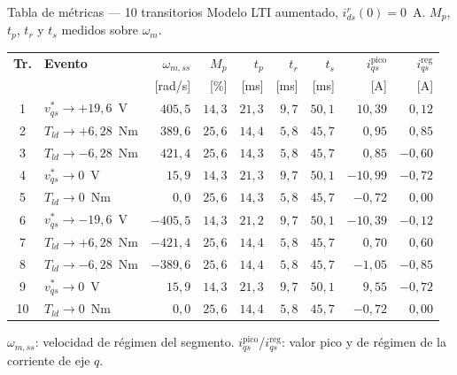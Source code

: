 \documentclass[aspectratio=169,t]{beamer}
\begin{document}
\begin{frame}{Tabla de métricas --- 10 transitorios}
{\small\color{uncGray}Modelo LTI aumentado, $i_{ds}^{r}(0)=0$~A. $M_p$, $t_p$, $t_r$ y $t_s$ medidos sobre $\omega_m$.}\par
\vspace{2mm}

\centering
\scriptsize
\renewcommand{\arraystretch}{1.1}
\begin{tabular}{|c|l|r|r|r|r|r|r|r|}
\hline
\textbf{Tr.} & \textbf{Evento} & $\omega_{m,ss}$ & $M_p$ & $t_p$ & $t_r$ & $t_s$ & $i_{qs}^{\text{pico}}$ & $i_{qs}^{\text{reg}}$ \\
 & & [rad/s] & [\%] & [ms] & [ms] & [ms] & [A] & [A] \\
\hline
1 & $v_{qs}^{*}\to+19{,}6$~V & $405{,}5$ & $14{,}3$ & $21{,}3$ & $9{,}7$ & $50{,}1$ & $10{,}39$ & $0{,}12$ \\
2 & $T_{ld}\to+6{,}28$~Nm & $389{,}6$ & $25{,}6$ & $14{,}4$ & $5{,}8$ & $45{,}7$ & $0{,}95$ & $0{,}85$ \\
3 & $T_{ld}\to-6{,}28$~Nm & $421{,}4$ & $25{,}6$ & $14{,}3$ & $5{,}8$ & $45{,}7$ & $0{,}85$ & $-0{,}60$ \\
4 & $v_{qs}^{*}\to 0$~V & $15{,}9$ & $14{,}3$ & $21{,}3$ & $9{,}7$ & $50{,}1$ & $-10{,}99$ & $-0{,}72$ \\
5 & $T_{ld}\to 0$~Nm & $0{,}0$ & $25{,}6$ & $14{,}3$ & $5{,}8$ & $45{,}7$ & $-0{,}72$ & $0{,}00$ \\
6 & $v_{qs}^{*}\to-19{,}6$~V & $-405{,}5$ & $14{,}3$ & $21{,}2$ & $9{,}7$ & $50{,}1$ & $-10{,}39$ & $-0{,}12$ \\
7 & $T_{ld}\to+6{,}28$~Nm & $-421{,}4$ & $25{,}6$ & $14{,}4$ & $5{,}8$ & $45{,}7$ & $0{,}70$ & $0{,}60$ \\
8 & $T_{ld}\to-6{,}28$~Nm & $-389{,}6$ & $25{,}6$ & $14{,}4$ & $5{,}8$ & $45{,}7$ & $-1{,}05$ & $-0{,}85$ \\
9 & $v_{qs}^{*}\to 0$~V & $15{,}9$ & $14{,}3$ & $21{,}3$ & $9{,}7$ & $50{,}1$ & $9{,}55$ & $-0{,}72$ \\
10 & $T_{ld}\to 0$~Nm & $0{,}0$ & $25{,}6$ & $14{,}4$ & $5{,}8$ & $45{,}7$ & $-0{,}72$ & $0{,}00$ \\
\hline
\end{tabular}
\normalsize

\vspace{2mm}
{\scriptsize $\omega_{m,ss}$: velocidad de régimen del segmento. $i_{qs}^{\text{pico}}$/$i_{qs}^{\text{reg}}$: valor pico y de régimen de la corriente de eje $q$.}
\end{frame}
\end{document}
